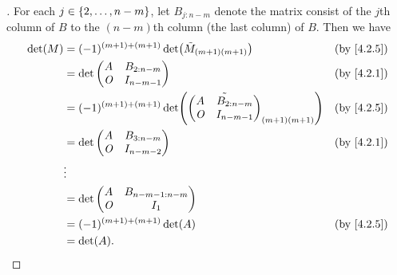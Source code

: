 \begin{proof}[]
  For each \(j \in \left\lbrace2, \dots, n - m\right\rbrace\), let \(B_{j : n - m}\) denote the matrix consist of the \(j\)th column of \(B\) to the \((n - m)\)th column (the last column) of \(B\).
  Then we have
  \begin{align*}
    \det(M) & = (-1)^{(m + 1) + (m + 1)} \det\pa{\tilde{M}_{(m + 1) (m + 1)}} &  & \by{4.2.5}                   \\
            & = \det\begin{pmatrix}
                      A   & B_{2 : n - m} \\
                      \zm & I_{n - m - 1}
                    \end{pmatrix}                                          &  & \by{4.2.1}                      \\
            & = (-1)^{(m + 1) + (m + 1)} \det\pa{\tilde{\begin{pmatrix}
                                                              A   & B_{2 : n - m} \\
                                                              \zm & I_{n - m - 1}
                                                            \end{pmatrix}}_{(m + 1) (m + 1)}}       &  & \by{4.2.5} \\
            & = \det\begin{pmatrix}
                      A   & B_{3 : n - m} \\
                      \zm & I_{n - m - 2}
                    \end{pmatrix}                                          &  & \by{4.2.1}                      \\
            & \vdots                                                                                            \\
            & = \det\begin{pmatrix}
                      A   & B_{n - m - 1 : n - m} \\
                      \zm & I_1
                    \end{pmatrix}                                                                 \\
            & = (-1)^{(m + 1) + (m + 1)} \det(A)                              &  & \by{4.2.5}                   \\
            & = \det(A).
  \end{align*}
\end{proof}


